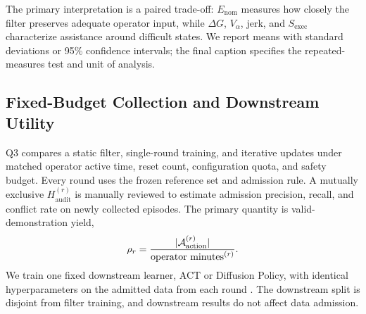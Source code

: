 The primary interpretation is a paired trade-off: $E_{\mathrm{nom}}$ measures
how closely the filter preserves adequate operator input, while $\Delta G$,
$V_\alpha$, jerk, and $S_{\mathrm{exec}}$ characterize assistance around
difficult states. We report means with standard deviations or 95\% confidence
intervals; the final caption specifies the repeated-measures test and unit of
analysis.

\subsection{Fixed-Budget Collection and Downstream Utility}
\label{sec:exp_flywheel}

Q3 compares a static filter, single-round training, and iterative updates under
matched operator active time, reset count, configuration quota, and safety
budget. Every round uses the frozen reference set and admission rule. A
mutually exclusive $H^{(r)}_{\mathrm{audit}}$ is manually reviewed to estimate
admission precision, recall, and conflict rate on newly collected episodes.
The primary quantity is valid-demonstration yield,
\begin{equation}
  \rho_r=\frac{|\mathcal{A}_{\mathrm{action}}^{(r)}|}
  {\operatorname{operator\ minutes}^{(r)}}.
  \label{eq:yield}
\end{equation}
We train one fixed downstream learner, ACT or Diffusion Policy, with identical hyperparameters on the
admitted data from each round \citep{zhaoLearningFineGrainedBimanual2023,chiDiffusionPolicyVisuomotor2024}.
The downstream split is disjoint from filter training, and downstream results
do not affect data admission.

